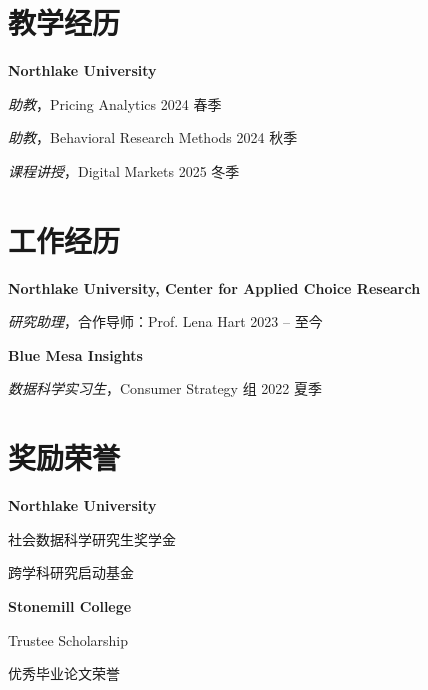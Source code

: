 \documentclass[11pt,letterpaper]{article}
\newenvironment{cvitems}
  {\begin{list}{}{\setlength{\leftmargin}{1.1em}\setlength{\itemsep}{0.25em}\setlength{\topsep}{0.15em}\setlength{\parsep}{0pt}\setlength{\partopsep}{0pt}}\small}
  {\end{list}}
\begin{document}
\section*{教学经历}
\begin{cvitems}
  \item \textbf{Northlake University}
  \item \hspace*{1.5em}\textit{助教}，Pricing Analytics \hfill 2024 春季
  \item \hspace*{1.5em}\textit{助教}，Behavioral Research Methods \hfill 2024 秋季
  \item \hspace*{1.5em}\textit{课程讲授}，Digital Markets \hfill 2025 冬季
\end{cvitems}

\section*{工作经历}
\begin{cvitems}
  \item \textbf{Northlake University, Center for Applied Choice Research}
  \item \hspace*{1.5em}\textit{研究助理}，合作导师：Prof. Lena Hart \hfill 2023 -- 至今
  \item \textbf{Blue Mesa Insights}
  \item \hspace*{1.5em}\textit{数据科学实习生}，Consumer Strategy 组 \hfill 2022 夏季
\end{cvitems}

\section*{奖励荣誉}
\begin{cvitems}
  \item \textbf{Northlake University}
  \item \hspace*{1.5em}社会数据科学研究生奖学金
  \item \hspace*{1.5em}跨学科研究启动基金
  \item \textbf{Stonemill College}
  \item \hspace*{1.5em}Trustee Scholarship
  \item \hspace*{1.5em}优秀毕业论文荣誉
\end{cvitems}
\end{document}
